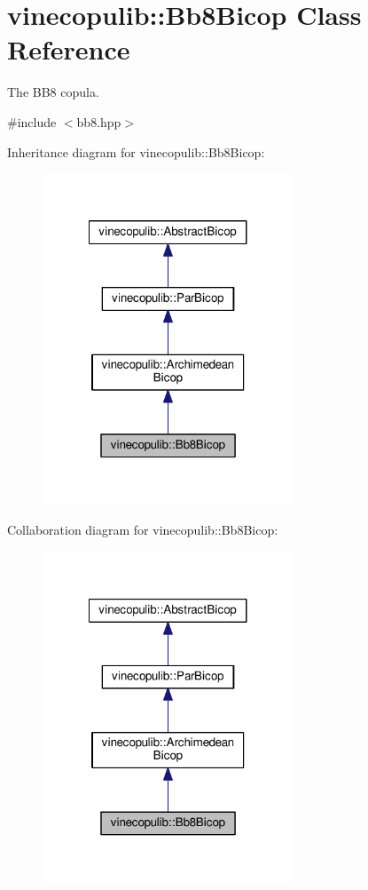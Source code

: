 \hypertarget{classvinecopulib_1_1_bb8_bicop}{\section{vinecopulib\+:\+:Bb8\+Bicop Class Reference}
\label{classvinecopulib_1_1_bb8_bicop}
}


The B\+B8 copula.  




{\ttfamily \#include $<$bb8.\+hpp$>$}



Inheritance diagram for vinecopulib\+:\+:Bb8\+Bicop\+:\nopagebreak
\begin{figure}[H]
\begin{center}
\leavevmode
\includegraphics[width=212pt]{classvinecopulib_1_1_bb8_bicop__inherit__graph}
\end{center}
\end{figure}


Collaboration diagram for vinecopulib\+:\+:Bb8\+Bicop\+:\nopagebreak
\begin{figure}[H]
\begin{center}
\leavevmode
\includegraphics[width=212pt]{classvinecopulib_1_1_bb8_bicop__coll__graph}
\end{center}
\end{figure}
